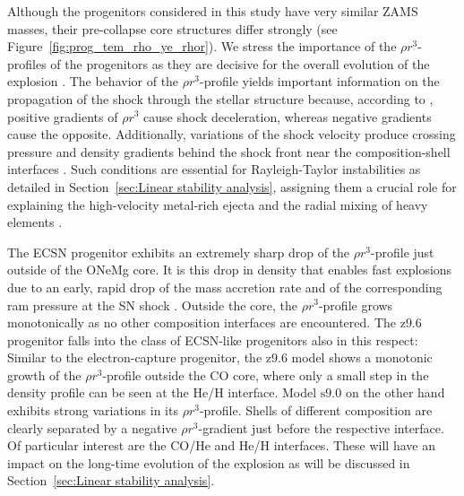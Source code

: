 \documentclass[fleqn,usenatbib]{mnras}
\newcommand{\snine}{\ensuremath{\mathrm{s9.0}}\xspace}
\newcommand{\znine}{\ensuremath{\mathrm{z9.6}}\xspace}
\begin{document}
Although the progenitors considered in this study have very 
similar ZAMS masses, 
their pre-collapse core structures differ strongly 
(see Figure~\ref{fig:prog_tem_rho_ye_rhor}).
We stress the importance of the $\rho r^3$-profiles of the progenitors as 
they are decisive for the overall evolution of the explosion 
\citep{Kifonidis2003,Wongwathanarat2015}. 
The behavior of the $\rho r^3$-profile yields important information on 
the propagation of the shock through the stellar structure because, 
according to \cite{Sedov1961}, positive gradients of $\rho r^3$ cause 
shock deceleration, whereas negative gradients cause the opposite. 
Additionally, variations of the shock velocity produce crossing 
pressure and density gradients behind the shock front near the 
composition-shell interfaces \citep{Chevalier1978}. 
Such conditions are essential for 
Rayleigh-Taylor instabilities as detailed in 
Section~\ref{sec:Linear stability analysis}, assigning them a 
crucial role for explaining the high-velocity metal-rich ejecta 
and the radial mixing of heavy elements 
\citep{Arnett1989,Nomoto1990,Wongwathanarat2015}.

The ECSN progenitor exhibits an extremely sharp drop of the 
$\rho r^3$-profile just outside of the ONeMg core. It is this drop 
in density that enables fast explosions due to an early, rapid drop 
of the mass accretion rate and of the corresponding ram pressure at the 
SN shock \citep{Kitaura2006}. Outside the core, the $\rho r^3$-profile 
grows monotonically as no other composition interfaces are encountered.
The \znine progenitor falls into the class of ECSN-like progenitors also 
in this respect: Similar to the electron-capture progenitor, the \znine
model shows a monotonic growth of the $\rho r^3$-profile outside the CO 
core, where only a small step in the density profile can be seen at the 
He/H interface.
Model \snine on the other hand exhibits strong variations in its 
$\rho r^3$-profile. Shells of different composition are clearly separated 
by a negative $\rho r^3$-gradient just before the respective interface. Of 
particular interest are the CO/He and He/H interfaces. These will have an 
impact on the long-time evolution of the explosion as will be discussed 
in Section~\ref{sec:Linear stability analysis}.
\end{document}
